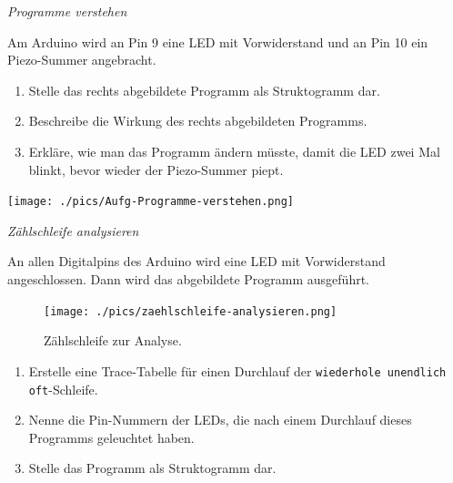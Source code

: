 \bigskip
\begin{aufgabe} \emph{Programme verstehen} \label{aufg:programme-verstehen}
	
	\begin{minipage}{0.48\textwidth}
		Am Arduino wird an Pin 9 eine LED mit Vorwiderstand und an Pin 10 ein Piezo-Summer angebracht.
		
		\begin{enumerate}[label=\alph*), itemsep=0ex]
			\item Stelle das rechts abgebildete Programm als Struktogramm dar.
			\item Beschreibe die Wirkung des rechts abgebildeten Programms.
			\item Erkläre, wie man das Programm ändern müsste, damit die LED zwei Mal blinkt, bevor wieder der Piezo-Summer piept.
		\end{enumerate}
	\end{minipage}
	\hfil
	\begin{minipage}{0.48\textwidth}
		\centering
		\texttt{[image: ./pics/Aufg-Programme-verstehen.png]}
	\end{minipage}
\end{aufgabe}

\bigskip
\begin{aufgabe} \emph{Zählschleife analysieren} \label{aufg:zaehlschleife-analysieren}
	
	An allen Digitalpins des Arduino wird eine LED mit Vorwiderstand angeschlossen. Dann wird das abgebildete Programm ausgeführt.
	
	\begin{figure}[H]
		\centering
		\texttt{[image: ./pics/zaehlschleife-analysieren.png]}
		\caption{Zählschleife zur Analyse.}
	\end{figure}
	
	\begin{enumerate}[label=\alph*), itemsep=0ex]
		\item Erstelle eine Trace-Tabelle für einen Durchlauf der \texttt{wiederhole unendlich oft}-Schleife.
		\item Nenne die Pin-Nummern der LEDs, die nach einem Durchlauf dieses Programms geleuchtet haben.
		\item Stelle das Programm als Struktogramm dar.
	\end{enumerate}
\end{aufgabe}



